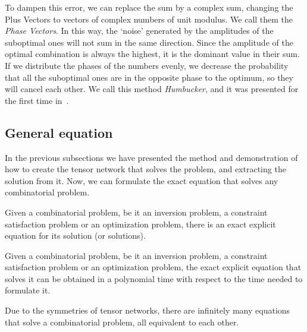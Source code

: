 To dampen this error, we can replace the sum by a complex sum, changing the Plus Vectors to vectors of complex numbers of unit modulus. We call them the \textit{Phase Vectors}. In this way, the `noise' generated by the amplitudes of the suboptimal ones will not sum in the same direction. Since the amplitude of the optimal combination is always the highest, it is the dominant value in their sum. If we distribute the phases of the numbers evenly, we decrease the probability that all the suboptimal ones are in the opposite phase to the optimum, so they will cancel each other. We call this method \textit{Humbucker}, and it was presented for the first time in~\cite{QUBO_Tridiagonal}.

\subsection{General equation}
In the previous subsections we have presented the method and demonstration of how to create the tensor network that solves the problem, and extracting the solution from it. Now, we can formulate the exact equation that solves any combinatorial problem.

\begin{theorem}
    Given a combinatorial problem, be it an inversion problem, a constraint satisfaction problem or an optimization problem, there is an exact explicit equation for its solution (or solutions).
\end{theorem}

\begin{theorem}
    Given a combinatorial problem, be it an inversion problem, a constraint satisfaction problem or an optimization problem, the exact explicit equation that solves it can be obtained in a polynomial time with respect to the time needed to formulate it.
\end{theorem}

\begin{theorem}
    Due to the symmetries of tensor networks, there are infinitely many equations that solve a combinatorial problem, all equivalent to each other.
\end{theorem}

